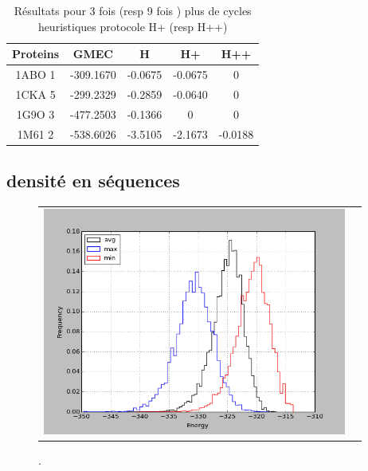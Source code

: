     \begin{table}[h]
      \centering

      \begin{tabular}{|c|c|c|c|c|}

        \hline
        Proteins & GMEC & H & H+ & H++ \\
        \hline
        1ABO 1 & -309.1670 & -0.0675 & -0.0675 & 0 \\
        1CKA 5 & -299.2329 & -0.2859 & -0.0640 & 0 \\
        1G9O 3 & -477.2503 & -0.1366 & 0 & 0 \\
        1M61 2 & -538.6026 & -3.5105 & -2.1673 & -0.0188 \\
        \hline


 \end{tabular}      
 \caption{Résultats pour 3 fois (resp 9 fois ) plus de cycles heuristiques protocole H+ (resp H++)}
 \label{tab_echec2BYG__1}       
\end{table}



    \clearpage

    \clearpage

   \subsection{densité en séquences }



    \begin{figure}[h]
      \centering
      \begin{tabular}{cc} 
        \includegraphics[width=10cm]{graphe/histo1_aa_Tambiante.png} &
      \end{tabular}
      
      \caption{.}
      \label{temps_CPU}
    \end{figure}


